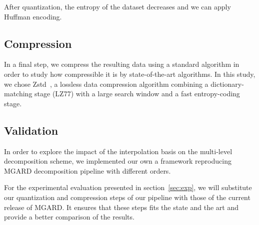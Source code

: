 \documentclass[conference]{IEEEtran}
\theoremstyle{remark}
\begin{document}

    After quantization, the entropy of the dataset decreases and we can apply Huffman encoding. 

    \subsection{Compression}
    In a final step, we compress the resulting data using a standard algorithm in order to study how compressible it is by state-of-the-art algorithms.
    In this study, we chose Zstd~\cite{collet2018zstandard}, a lossless data compression algorithm combining a dictionary-matching stage (LZ77) with a large search window and a fast entropy-coding stage. 

\subsection{Validation}
In order to explore the impact of the interpolation basis on the multi-level decomposition scheme, we implemented our own a framework reproducing MGARD decomposition pipeline with different orders. 

For the experimental evaluation presented in section~\ref{sec:exp}, we will substitute our quantization and compression steps of our pipeline with those of the current release of MGARD. It ensures that these steps fits the state and the art and provide a better comparison of the results.
\end{document}
